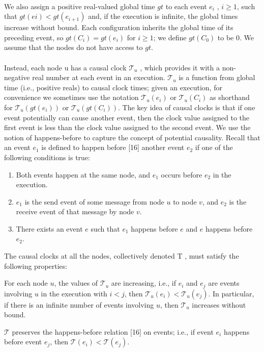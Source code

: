 \paragraph{}We also assign a positive real-valued global time $gt$ to each event $e_i$ , $i \geq 1$, such that $gt(ei) < gt(e_{i+1})$ and, if the execution is infinite, the global times increase without bound. Each configuration inherits the global time of its preceding event, so $gt(C_i) = gt(e_i)$ for $i \geq 1$; we define $gt(C_0)$ to be $0$. We assume that the nodes do not have access to $gt$.
\paragraph{}Instead, each node u has a causal clock $\mathcal{T}_u$ , which provides it with a non-negative real number at each event in an execution. $\mathcal{T}_u$ is a function from global time (i.e., positive reals) to causal clock times; given an execution, for convenience we sometimes use the notation $\mathcal{T}_u(e_i)$ or $\mathcal{T}_u(C_i)$ as shorthand for $\mathcal{T}_u(gt(e_i))$ or $\mathcal{T}_u(gt(C_i))$. The key idea of causal clocks is that if one event potentially can cause another event, then the clock value assigned to the first event is less than the clock value assigned to the second event. We use the notion of happens-before to capture the concept of potential causality. Recall that an event $e_1$ is defined to happen before [16] another event $e_2$ if one of the following conditions is true:
\begin{enumerate}
	\item Both events happen at the same node, and $e_1$ occurs before $e_2$ in the execution.
	\item $e_1$ is the send event of some message from node $u$ to node $v$, and $e_2$ is the receive event of that message by node $v$.
	\item There exists an event $e$ such that $e_1$ happens before $e$ and $e$ happens before $e_2$.
\end{enumerate}
The causal clocks at all the nodes, collectively denoted T , must satisfy the following properties:
\begin{list}{--}{spacing}
	\item For each node $u$, the values of $\mathcal{T}_u$ are increasing, i.e., if $e_i$ and $e_j$ are events involving $u$ in the execution with $i < j$, then $\mathcal{T}_u(e_i) < \mathcal{T}_u(e_j)$. In particular, if there is an infinite number of events involving $u$, then $\mathcal{T}_u$ increases without bound.
	\item $\mathcal{T}$ preserves the happens-before relation [16] on events; i.e., if event $e_i$ happens before event $e_j$, then $\mathcal{T}(e_i) < \mathcal{T}(e_j)$.
\end{list}
